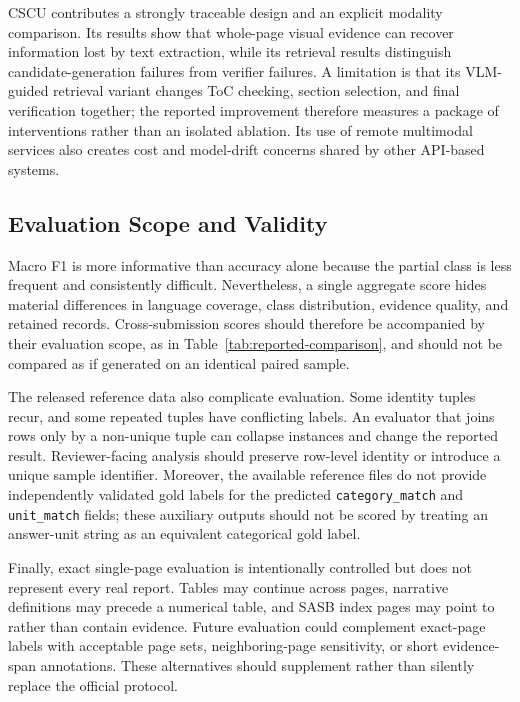 \documentclass[sigconf,article]{acmart}
\begin{document}
CSCU contributes a strongly traceable design and an explicit modality comparison. Its results show that whole-page visual evidence can recover information lost by text extraction, while its retrieval results distinguish candidate-generation failures from verifier failures. A limitation is that its VLM-guided retrieval variant changes ToC checking, section selection, and final verification together; the reported improvement therefore measures a package of interventions rather than an isolated ablation. Its use of remote multimodal services also creates cost and model-drift concerns shared by other API-based systems.

\subsection{Evaluation Scope and Validity}
Macro F1 is more informative than accuracy alone because the partial class is less frequent and consistently difficult. Nevertheless, a single aggregate score hides material differences in language coverage, class distribution, evidence quality, and retained records. Cross-submission scores should therefore be accompanied by their evaluation scope, as in Table~\ref{tab:reported-comparison}, and should not be compared as if generated on an identical paired sample.

The released reference data also complicate evaluation. Some identity tuples recur, and some repeated tuples have conflicting labels. An evaluator that joins rows only by a non-unique tuple can collapse instances and change the reported result. Reviewer-facing analysis should preserve row-level identity or introduce a unique sample identifier. Moreover, the available reference files do not provide independently validated gold labels for the predicted \texttt{category\_match} and \texttt{unit\_match} fields; these auxiliary outputs should not be scored by treating an answer-unit string as an equivalent categorical gold label.

Finally, exact single-page evaluation is intentionally controlled but does not represent every real report. Tables may continue across pages, narrative definitions may precede a numerical table, and SASB index pages may point to rather than contain evidence. Future evaluation could complement exact-page labels with acceptable page sets, neighboring-page sensitivity, or short evidence-span annotations. These alternatives should supplement rather than silently replace the official protocol.
\end{document}
